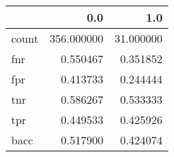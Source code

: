 \begin{tabular}{lrr}
\toprule
{} &         0.0 &        1.0 \\
\midrule
count &  356.000000 &  31.000000 \\
fnr   &    0.550467 &   0.351852 \\
fpr   &    0.413733 &   0.244444 \\
tnr   &    0.586267 &   0.533333 \\
tpr   &    0.449533 &   0.425926 \\
bacc  &    0.517900 &   0.424074 \\
\bottomrule
\end{tabular}
